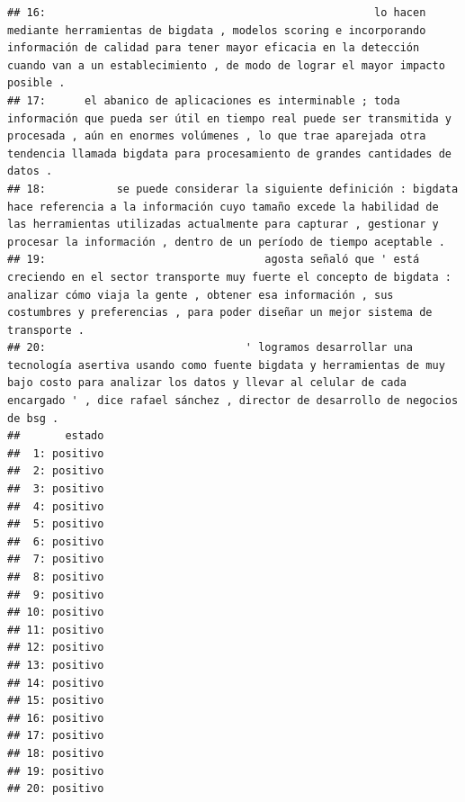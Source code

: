 \documentclass[
]{book}
\newenvironment{Shaded}{\begin{snugshade}}{\end{snugshade}}
\newcommand{\AttributeTok}[1]{\textcolor[rgb]{0.77,0.63,0.00}{#1}}
\newcommand{\DecValTok}[1]{\textcolor[rgb]{0.00,0.00,0.81}{#1}}
\newcommand{\FunctionTok}[1]{\textcolor[rgb]{0.00,0.00,0.00}{#1}}
\newcommand{\NormalTok}[1]{#1}
\newcommand{\SpecialCharTok}[1]{\textcolor[rgb]{0.00,0.00,0.00}{#1}}
\newcommand{\StringTok}[1]{\textcolor[rgb]{0.31,0.60,0.02}{#1}}
\begin{document}
\begin{verbatim}
## 16:                                                   lo hacen mediante herramientas de bigdata , modelos scoring e incorporando información de calidad para tener mayor eficacia en la detección cuando van a un establecimiento , de modo de lograr el mayor impacto posible .
## 17:      el abanico de aplicaciones es interminable ; toda información que pueda ser útil en tiempo real puede ser transmitida y procesada , aún en enormes volúmenes , lo que trae aparejada otra tendencia llamada bigdata para procesamiento de grandes cantidades de datos .
## 18:           se puede considerar la siguiente definición : bigdata hace referencia a la información cuyo tamaño excede la habilidad de las herramientas utilizadas actualmente para capturar , gestionar y procesar la información , dentro de un período de tiempo aceptable .
## 19:                                  agosta señaló que ' está creciendo en el sector transporte muy fuerte el concepto de bigdata : analizar cómo viaja la gente , obtener esa información , sus costumbres y preferencias , para poder diseñar un mejor sistema de transporte .
## 20:                               ' logramos desarrollar una tecnología asertiva usando como fuente bigdata y herramientas de muy bajo costo para analizar los datos y llevar al celular de cada encargado ' , dice rafael sánchez , director de desarrollo de negocios de bsg .
##       estado
##  1: positivo
##  2: positivo
##  3: positivo
##  4: positivo
##  5: positivo
##  6: positivo
##  7: positivo
##  8: positivo
##  9: positivo
## 10: positivo
## 11: positivo
## 12: positivo
## 13: positivo
## 14: positivo
## 15: positivo
## 16: positivo
## 17: positivo
## 18: positivo
## 19: positivo
## 20: positivo
\end{verbatim}

\begin{Shaded}
\end{Shaded}
\end{document}
